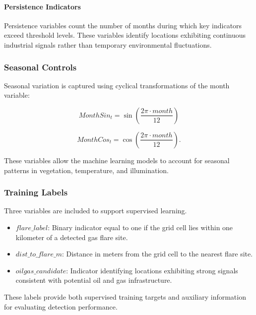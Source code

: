 \documentclass[12pt]{article}
\begin{document}
\paragraph{Persistence Indicators}

Persistence variables count the number of months during which key indicators exceed threshold levels. These variables identify locations exhibiting continuous industrial signals rather than temporary environmental fluctuations.

\subsubsection{Seasonal Controls}

Seasonal variation is captured using cyclical transformations of the month variable:

\[
MonthSin_t = \sin\left(\frac{2\pi \cdot month}{12}\right)
\]

\[
MonthCos_t = \cos\left(\frac{2\pi \cdot month}{12}\right).
\]

These variables allow the machine learning models to account for seasonal patterns in vegetation, temperature, and illumination.

\subsubsection{Training Labels}

Three variables are included to support supervised learning.

\begin{itemize}
\item $flare\_label$: Binary indicator equal to one if the grid cell lies within one kilometer of a detected gas flare site.
\item $dist\_to\_flare\_m$: Distance in meters from the grid cell to the nearest flare site.
\item $oilgas\_candidate$: Indicator identifying locations exhibiting strong signals consistent with potential oil and gas infrastructure.
\end{itemize}

These labels provide both supervised training targets and auxiliary information for evaluating detection performance.
\end{document}
